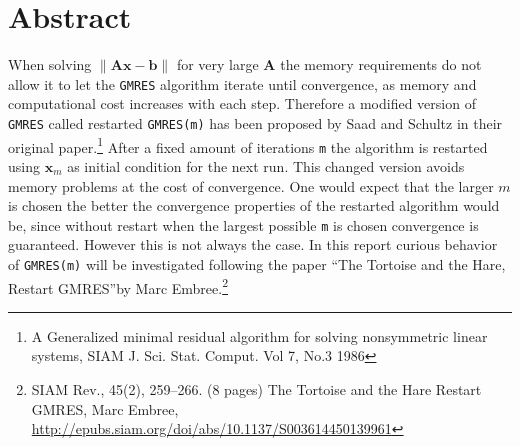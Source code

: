 \section{Abstract}
When solving $\|\mathbf{Ax} - \mathbf{b}\|$ for very large $\mathbf{A}$
the memory requirements do not allow it to let the \texttt{GMRES} algorithm iterate until convergence, as memory and computational cost increases with each step. Therefore a modified version of \texttt{GMRES} called restarted \texttt{GMRES(m)} has been proposed by Saad and Schultz in their original paper.\footnote{A Generalized minimal residual algorithm for solving nonsymmetric linear systems, SIAM J. Sci. Stat. Comput. Vol 7, No.3 1986} After a fixed amount of iterations \texttt{m} the algorithm is restarted using $\mathbf{x}_m$ as initial condition for the next run. This changed version  avoids memory problems at the cost of convergence. One would expect that the larger $m$ is chosen the better the convergence properties of the restarted algorithm would be, since without restart when the largest possible \texttt{m} is chosen convergence is guaranteed. However this is not always the case. In this report curious behavior of \texttt{GMRES(m)} will be investigated following the paper \textquotedblleft The Tortoise and the Hare, Restart GMRES\textquotedblright   by Marc Embree.\footnote{SIAM Rev., 45(2), 259–266. (8 pages) The Tortoise and the Hare Restart GMRES, Marc Embree,
\url{http://epubs.siam.org/doi/abs/10.1137/S003614450139961}}
